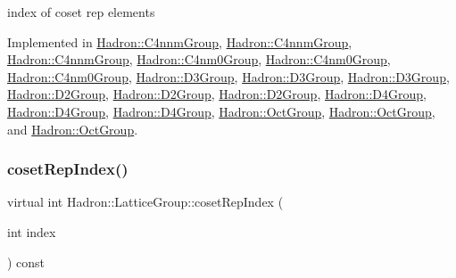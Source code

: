 index of coset rep elements 

Implemented in \mbox{\hyperlink{structHadron_1_1C4nnmGroup_a413031d9855013b22c493696c69a2c4d}{Hadron\+::\+C4nnm\+Group}}, \mbox{\hyperlink{structHadron_1_1C4nnmGroup_a413031d9855013b22c493696c69a2c4d}{Hadron\+::\+C4nnm\+Group}}, \mbox{\hyperlink{structHadron_1_1C4nnmGroup_a413031d9855013b22c493696c69a2c4d}{Hadron\+::\+C4nnm\+Group}}, \mbox{\hyperlink{structHadron_1_1C4nm0Group_abac118ef8b96cecf62143c917e23736e}{Hadron\+::\+C4nm0\+Group}}, \mbox{\hyperlink{structHadron_1_1C4nm0Group_abac118ef8b96cecf62143c917e23736e}{Hadron\+::\+C4nm0\+Group}}, \mbox{\hyperlink{structHadron_1_1C4nm0Group_abac118ef8b96cecf62143c917e23736e}{Hadron\+::\+C4nm0\+Group}}, \mbox{\hyperlink{structHadron_1_1D3Group_a361cfe22330be972fe6d49bc2e1af871}{Hadron\+::\+D3\+Group}}, \mbox{\hyperlink{structHadron_1_1D3Group_a361cfe22330be972fe6d49bc2e1af871}{Hadron\+::\+D3\+Group}}, \mbox{\hyperlink{structHadron_1_1D3Group_a361cfe22330be972fe6d49bc2e1af871}{Hadron\+::\+D3\+Group}}, \mbox{\hyperlink{structHadron_1_1D2Group_a41bfcefe5a659b99db790f822123593f}{Hadron\+::\+D2\+Group}}, \mbox{\hyperlink{structHadron_1_1D2Group_a41bfcefe5a659b99db790f822123593f}{Hadron\+::\+D2\+Group}}, \mbox{\hyperlink{structHadron_1_1D2Group_a41bfcefe5a659b99db790f822123593f}{Hadron\+::\+D2\+Group}}, \mbox{\hyperlink{structHadron_1_1D4Group_ae7ebfa25f82987479c33f0d5d769ab2f}{Hadron\+::\+D4\+Group}}, \mbox{\hyperlink{structHadron_1_1D4Group_ae7ebfa25f82987479c33f0d5d769ab2f}{Hadron\+::\+D4\+Group}}, \mbox{\hyperlink{structHadron_1_1D4Group_ae7ebfa25f82987479c33f0d5d769ab2f}{Hadron\+::\+D4\+Group}}, \mbox{\hyperlink{structHadron_1_1OctGroup_aeaabc93ad3df1b585bc1009b0bf4f5ba}{Hadron\+::\+Oct\+Group}}, \mbox{\hyperlink{structHadron_1_1OctGroup_aeaabc93ad3df1b585bc1009b0bf4f5ba}{Hadron\+::\+Oct\+Group}}, and \mbox{\hyperlink{structHadron_1_1OctGroup_aeaabc93ad3df1b585bc1009b0bf4f5ba}{Hadron\+::\+Oct\+Group}}.

\mbox{\label{structHadron_1_1LatticeGroup_a7e3b9b5e2f596e6c40d64aa939a3ad6c}} 
\subsubsection{\texorpdfstring{cosetRepIndex()}{cosetRepIndex()}\hspace{0.1cm}{\footnotesize\ttfamily [3/3]}}
{\footnotesize\ttfamily virtual int Hadron\+::\+Lattice\+Group\+::coset\+Rep\+Index (\begin{DoxyParamCaption}\item[{int}]{index }\end{DoxyParamCaption}) const\hspace{0.3cm}{\ttfamily [pure virtual]}}


